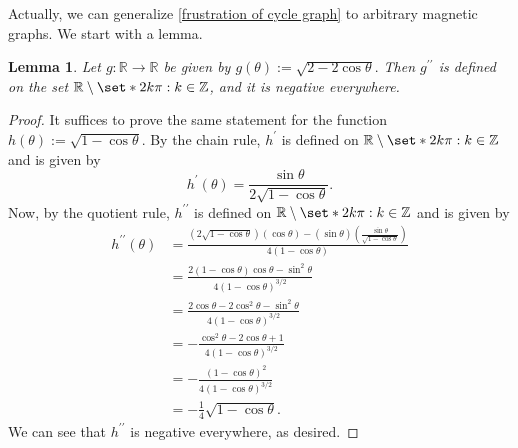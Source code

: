 \documentclass[12pt]{article}
\newtheorem{lem}[thm]{Lemma}
\theoremstyle{definition}
\newcommand{\Z}{\mathbb Z}
\newcommand{\R}{\mathbb R}
\begin{document}
Actually, we can generalize \cref{frustration of cycle graph} to arbitrary magnetic graphs. We start with a lemma.

\begin{lem}\label{lemma for frustration spanning tree thm}
Let $g : \R \rightarrow \R$ be given by $g(\theta) := \sqrt{2 - 2 \cos \theta}.$ Then $g^{\prime \prime}$ is defined on the set $\R \setminus \set*{2 k \pi : k \in \Z}$, and it is negative everywhere.
\end{lem}
\begin{proof}
It suffices to prove the same statement for the function $h(\theta) := \sqrt{1 - \cos \theta}$. By the chain rule, $h^\prime$ is defined on $\R \setminus \set*{2 k \pi : k \in \Z}$ and is given by 
$$h^\prime(\theta) = \frac{\sin \theta}{2 \sqrt{1 - \cos \theta}}.$$   
Now, by the quotient rule, $h^{\prime \prime}$ is defined on $\R \setminus \set*{2 k \pi : k \in \Z}$ and is given by
\begin{align*}
h^{\prime \prime}(\theta) 
&= \frac{\left( 2 \sqrt{1 - \cos \theta} \right) ( \cos \theta ) - (\sin \theta) \left( \frac{\sin \theta}{\sqrt{1 - \cos \theta}} \right)}{4(1 - \cos \theta)} \\
&= \frac{2(1 - \cos \theta) \cos \theta - \sin^2 \theta}{4(1 - \cos \theta)^{3/2}} \\
&= \frac{2 \cos \theta - 2 \cos^2 \theta - \sin^2 \theta}{4(1 - \cos \theta)^{3/2}} \\
&= - \frac{\cos^2 \theta - 2 \cos \theta + 1}{4(1 - \cos \theta)^{3/2}} \\
&= - \frac{(1 - \cos \theta)^2}{4(1 - \cos \theta)^{3/2}} \\
&= - \frac{1}{4} \sqrt{1 - \cos \theta}.
\end{align*}
We can see that $h^{\prime \prime}$ is negative everywhere, as desired.
\end{proof}
\end{document}
